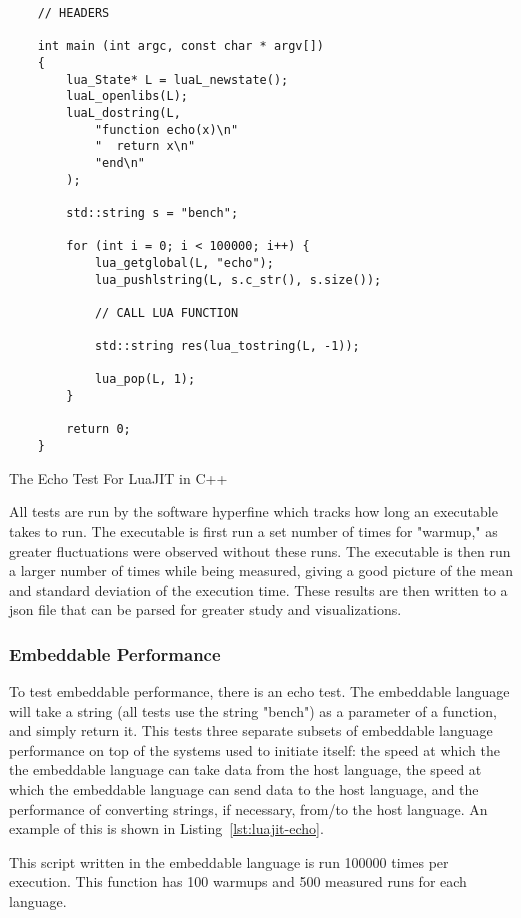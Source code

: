 \begin{listing}[H]
    \begin{verbatim}
    // HEADERS

    int main (int argc, const char * argv[])
    {
        lua_State* L = luaL_newstate();
        luaL_openlibs(L);
        luaL_dostring(L, 
            "function echo(x)\n"
            "  return x\n"
            "end\n"
        );

        std::string s = "bench";

        for (int i = 0; i < 100000; i++) {
            lua_getglobal(L, "echo");
            lua_pushlstring(L, s.c_str(), s.size());

            // CALL LUA FUNCTION

            std::string res(lua_tostring(L, -1));

            lua_pop(L, 1);
        }

        return 0;
    }
    \end{verbatim}
    \caption{The Echo Test For LuaJIT in C++}
    \label{lst:luajit-echo}
\end{listing}

All tests are run by the software hyperfine\cite{hyperfine} which tracks how long an executable takes to run. The executable is first run a set number of times for "warmup," as greater fluctuations were observed without these runs. The executable is then run a larger number of times while being measured, giving a good picture of the mean and standard deviation of the execution time. These results are then written to a json file that can be parsed for greater study and visualizations.

\subsubsection{Embeddable Performance}
To test embeddable performance, there is an echo test. The embeddable language will take a string (all tests use the string "bench") as a parameter of a function, and simply return it. This tests three separate subsets of embeddable language performance on top of the systems used to initiate itself: the speed at which the the embeddable language can take data from the host language, the speed at which the embeddable language can send data to the host language, and the performance of converting strings, if necessary, from/to the host language. An example of this is shown in Listing~\ref{lst:luajit-echo}.

This script written in the embeddable language is run 100000 times per execution. This function has 100 warmups and 500 measured runs for each language.

